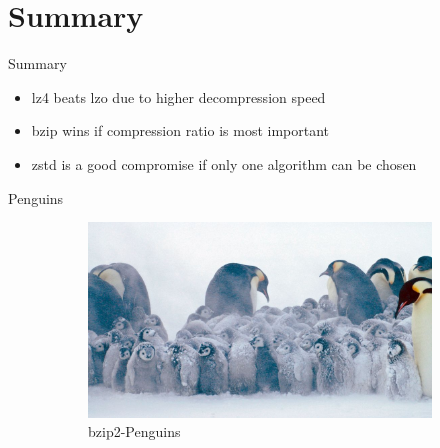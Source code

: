 \documentclass[10pt, compress]{beamer}
\begin{document}
\section{Summary}
\begin{frame}{Summary}
    \begin{itemize}
        \item lz4 beats lzo due to higher decompression speed
        \item bzip wins if compression ratio is most important
        \item zstd is a good compromise if only one algorithm can be chosen
    \end{itemize}
\end{frame}

\begin{frame}{Penguins}
\begin{figure}
\captionsetup[subfigure]{labelformat=empty}
  \begin{subfigure}[b]{.45\linewidth}
    \centering
    \caption{bzip2-Penguins}
    \includegraphics[scale=0.15, angle=5]{pics/bzip2penguin.jpg}
  \end{subfigure}\hfill
  \begin{subfigure}[b]{.45\linewidth}
  	\centering
  \end{subfigure}
\end{figure}
\end{frame}
\end{document}
